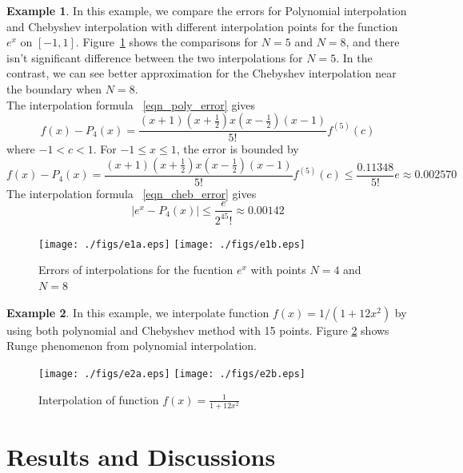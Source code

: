 \documentclass[11pt,reqno]{amsart}
\theoremstyle{definition}
\newtheorem{exmp}{Example}[section]
\begin{document}
\begin{exmp}
In this example, we compare the errors for Polynomial interpolation and Chebyshev interpolation with different interpolation points for the function $e^x$ on $[-1,1]$. Figure~\ref{fig:e1} shows the comparisons for $N=5$ and $N=8$, and there isn't significant difference between the two interpolations for $N=5$. In the contrast, we can see better approximation for the Chebyshev interpolation near the boundary when  $N=8$.\\
The interpolation formula ~\eqref{eqn_poly_error} gives 
\begin{equation}
f(x)-P_4(x)=\frac{(x+1)(x+\frac{1}{2})x(x-\frac{1}{2})(x-1)}{5!}f^{(5)}(c)
\end{equation}
where $-1<c<1$. For $-1\leq x\leq 1$, the error is bounded by
\begin{equation*}
f(x)-P_4(x)=\frac{(x+1)(x+\frac{1}{2})x(x-\frac{1}{2})(x-1)}{5!}f^{(5)}(c)\leq \frac{0.11348}{5!}e\approx 0.002570
\end{equation*}
The interpolation formula ~\eqref{eqn_cheb_error} gives 
\begin{equation*}
|e^x-P_4(x)|\leq \frac{e}{2^45!}\approx 0.00142
\end{equation*}

\begin{figure}[H]     	\centerline{\texttt{[image: ./figs/e1a.eps]}
      	\hspace{-6pt}
     	\texttt{[image: ./figs/e1b.eps]}}
     	\hspace{-6pt}
		\caption{Errors of interpolations for the fucntion $e^x$ with points $N=4$ and $N=8$}
        \label{fig:e1}
\end{figure}
\end{exmp}

\begin{exmp}
In this example, we interpolate function $f(x)=1/(1+12x^2)$ by using both polynomial and Chebyshev method with 15 points. Figure \ref{fig:e2} shows Runge phenomenon from polynomial interpolation.
\begin{figure}[H] 	
        \centerline{\texttt{[image: ./figs/e2a.eps]}
      	\hspace{-6pt}
     	\texttt{[image: ./figs/e2b.eps]}}
     	\hspace{-6pt}
		\caption{Interpolation of function $f(x)=\frac{1}{1+12x^2}$}
        \label{fig:e2}
\end{figure}
\end{exmp}

\section{Results and Discussions}
\end{document}
